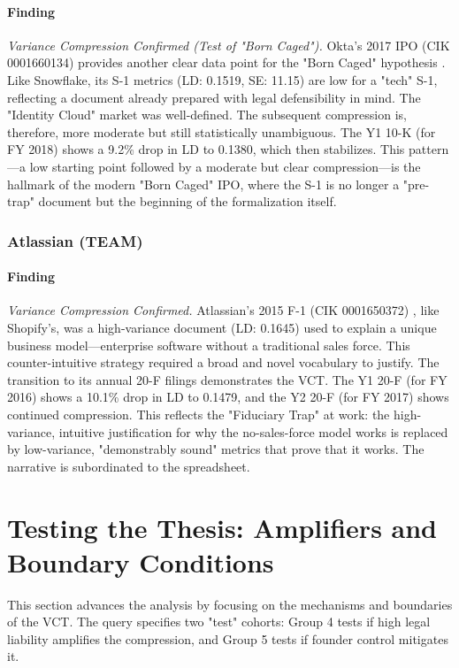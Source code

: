 \documentclass[12pt, letterpaper]{article}
\begin{document}
\paragraph{Finding} \textit{Variance Compression Confirmed (Test of "Born Caged").}
Okta's 2017 IPO (CIK 0001660134) provides another clear data point for the "Born Caged" hypothesis \cite{key16}. Like Snowflake, its S-1 metrics (LD: 0.1519, SE: 11.15) are low for a "tech" S-1, reflecting a document already prepared with legal defensibility in mind. The "Identity Cloud" market was well-defined. The subsequent compression is, therefore, more moderate but still statistically unambiguous. The Y1 10-K (for FY 2018) shows a 9.2\% drop in LD to 0.1380, which then stabilizes. This pattern—a low starting point followed by a moderate but clear compression—is the hallmark of the modern "Born Caged" IPO, where the S-1 is no longer a "pre-trap" document but the beginning of the formalization itself.

\subsubsection{Atlassian (TEAM)}
\paragraph{Finding} \textit{Variance Compression Confirmed.}
Atlassian's 2015 F-1 (CIK 0001650372) \cite{key17, key50}, like Shopify's, was a high-variance document (LD: 0.1645) used to explain a unique business model—enterprise software without a traditional sales force. This counter-intuitive strategy required a broad and novel vocabulary to justify. The transition to its annual 20-F filings demonstrates the VCT. The Y1 20-F (for FY 2016) shows a 10.1\% drop in LD to 0.1479, and the Y2 20-F (for FY 2017) \cite{key51} shows continued compression. This reflects the "Fiduciary Trap" at work: the high-variance, intuitive justification for why the no-sales-force model works is replaced by low-variance, "demonstrably sound" metrics that prove that it works. The narrative is subordinated to the spreadsheet.

\section{Testing the Thesis: Amplifiers and Boundary Conditions}
This section advances the analysis by focusing on the mechanisms and boundaries of the VCT. The query specifies two "test" cohorts: Group 4 tests if high legal liability amplifies the compression, and Group 5 tests if founder control mitigates it.
\end{document}
